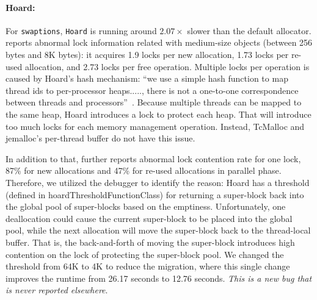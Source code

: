 
\paragraph{Hoard:} 
For \texttt{swaptions}, \texttt{Hoard} is running around $2.07\times$ slower than the default allocator. \MP{} reports abnormal lock information related with medium-size objects (between 256 bytes and 8K bytes): it acquires 1.9 locks per new allocation, 1.73 locks per re-used allocation, and 2.73 locks per free operation. 
Multiple locks per operation is caused by Hoard's hash mechanism: ``we use a simple hash function to map thread ids to per-processor heaps....., there is not a one-to-one correspondence between threads and processors''~\cite{Hoard}. Because multiple threads can be mapped to the same heap, Hoard introduces a lock to protect each heap. That will introduce too much locks for each memory management operation. Instead,  TcMalloc and jemalloc's per-thread buffer do not have this issue. 

In addition to that, \MP{} further reports abnormal lock contention rate for one lock, 87\% for new allocations and 47\% for re-used allocations in parallel phase. Therefore, we utilized the debugger to identify the reason: Hoard has a threshold (defined in hoardThresholdFunctionClass) for returning a super-block back into the global pool of super-blocks based on the emptiness. Unfortunately, one deallocation could cause the current super-block to be placed into the global pool, while the next allocation will move the super-block back to the thread-local buffer. That is, the back-and-forth of moving the super-block introduces high contention on the lock of protecting the super-block pool. We changed the threshold from 64K to 4K to reduce the migration, where this single change improves the runtime from 26.17 seconds to 12.76 seconds. \textit{This is a new bug that is never reported elsewhere}. 

